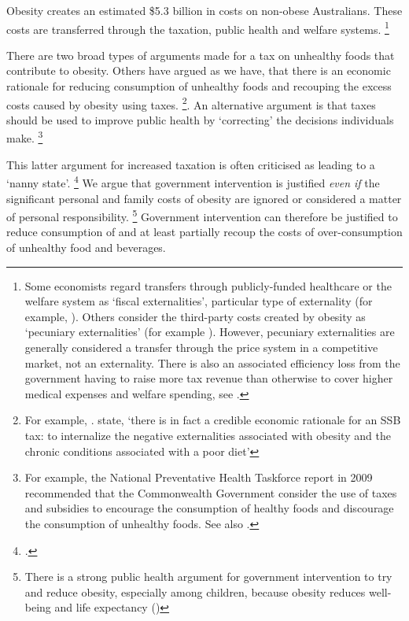 \documentclass[embargoed]{grattan}
\begin{document}
Obesity creates an estimated \$5.3 billion in costs on non-obese Australians.
These costs are transferred through the taxation, public health and welfare systems.%
\footnote{Some economists regard transfers through publicly-funded healthcare or the welfare system as `fiscal externalities', particular type of externality (for example, \textcite{Browning1999mythfiscalexternalities}).
Others consider the third-party costs created by obesity as `pecuniary externalities' (for example \textcite{Commission2010ChildhoodObesityEconomic}).
However, pecuniary externalities are generally considered a transfer through the price system in a competitive market, not an externality.
There is also an associated efficiency loss from the government having to raise more tax revenue than otherwise to cover higher medical expenses and welfare spending, see \textcite{Daley2015Propertytaxes}.}

There are two broad types of arguments made for a tax on unhealthy foods that contribute to obesity.
Others have argued as we have, that there is an economic rationale for reducing consumption of unhealthy foods and recouping the excess costs caused by obesity using taxes.%
\footnote{For example, \textcites{Veerman2016ImpactTaxSugar}{Karnani2016ObesityCrisisas}{Cawley2012medicalcarecosts}{Parks2012MarginalExternalCost}. \textcite{Cawley2015IncidenceTaxesSugar} state, `there is in fact a credible economic rationale for an SSB tax: to internalize the negative externalities associated with obesity and the chronic conditions associated with a poor diet'}.
An alternative argument is that taxes should be used to improve public health by `correcting' the decisions individuals make.%
\footnote{For example, the National Preventative Health Taskforce report in 2009 recommended that the Commonwealth Government consider the use of taxes and subsidies to encourage the consumption of healthy foods and discourage the consumption of unhealthy foods.
See also \textcites{Powell2013Assessingpotentialeffectiveness}{Organisation2015Usingpricepolicies}{Thow2014systematicrevieweffectiveness}{Sassi2013rolefiscalpolicies}.}

This latter argument for increased taxation is often criticised as leading to a `nanny state'.%
\footcites{Novak2012Nannystatetaxes}{Keane2016Sugarohhoney}{Lesh2016Greenssoftdrinks}{Elliott2016TomElliottsays} We argue that government intervention is justified \emph{even if} the significant personal and family costs of obesity are ignored or considered a matter of personal responsibility.%
\footnote{There is a strong public health argument for government intervention to try and reduce obesity, especially among children, because obesity reduces well-being and life expectancy (\textcites{Roberto2015Patchyprogressobesity}{Waters2011Interventionspreventingobesity}{Ewart-Pierce2016WholeCommunityObesity})} Government intervention can therefore be justified to reduce consumption of and at least partially recoup the costs of over-consumption of unhealthy food and beverages.
\end{document}
